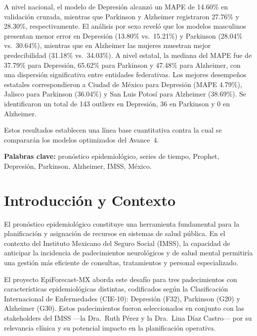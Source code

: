 \documentclass[11pt,a4paper]{article}
\begin{document}
A nivel nacional, el modelo de Depresión alcanzó un MAPE de 14.60\% en validación cruzada, mientras que Parkinson y Alzheimer registraron 27.76\% y 28.30\%, respectivamente. El análisis por sexo reveló que los modelos masculinos presentan menor error en Depresión (13.80\% vs.\ 15.21\%) y Parkinson (28.04\% vs.\ 30.64\%), mientras que en Alzheimer las mujeres muestran mejor predecibilidad (31.18\% vs.\ 34.03\%). A nivel estatal, la mediana del MAPE fue de 37.79\% para Depresión, 65.62\% para Parkinson y 47.48\% para Alzheimer, con una dispersión significativa entre entidades federativas. Los mejores desempeños estatales correspondieron a Ciudad de México para Depresión (MAPE 4.79\%), Jalisco para Parkinson (36.04\%) y San Luis Potosí para Alzheimer (38.69\%). Se identificaron un total de 143 outliers en Depresión, 36 en Parkinson y 0 en Alzheimer.

Estos resultados establecen una línea base cuantitativa contra la cual se compararán los modelos optimizados del Avance~4.

\textbf{Palabras clave:} pronóstico epidemiológico, series de tiempo, Prophet, Depresión, Parkinson, Alzheimer, IMSS, México.

\newpage
\tableofcontents
\newpage

\section{Introducción y Contexto}\label{sec:intro}

El pronóstico epidemiológico constituye una herramienta fundamental para la planificación y asignación de recursos en sistemas de salud pública. En el contexto del Instituto Mexicano del Seguro Social (IMSS), la capacidad de anticipar la incidencia de padecimientos neurológicos y de salud mental permitiría una gestión más eficiente de consultas, tratamientos y personal especializado.

El proyecto EpiForecast-MX aborda este desafío para tres padecimientos con características epidemiológicas distintas, codificados según la Clasificación Internacional de Enfermedades (CIE-10): Depresión (F32), Parkinson (G20) y Alzheimer (G30). Estos padecimientos fueron seleccionados en conjunto con las stakeholders del IMSS —la Dra.\ Ruth Pérez y la Dra.\ Lina Díaz Castro— por su relevancia clínica y su potencial impacto en la planificación operativa.
\end{document}
